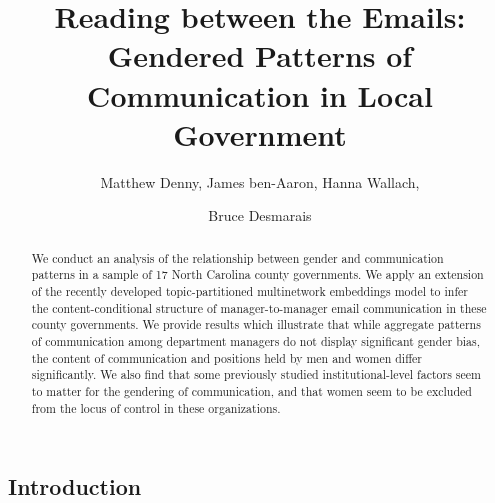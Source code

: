 \documentclass{pnastwo}
\begin{document}
\title{Reading between the Emails: Gendered Patterns of Communication in Local Government}

\author{
Matthew Denny,
James ben-Aaron,
Hanna Wallach,
\and Bruce Desmarais
}

\contributor{\vspace{-.25cm}}


\maketitle

\begin{article}
\begin{abstract}
{We conduct an analysis of the relationship between gender and communication patterns in a sample of 17 North Carolina county governments. We apply an extension of the recently developed topic-partitioned multinetwork embeddings model to infer the content-conditional structure of manager-to-manager email communication in these county governments. We provide results which illustrate that while aggregate patterns of communication among department managers do not display significant gender bias, the content of communication and positions held by men and women differ significantly. We also find that some previously studied institutional-level factors seem to matter for the gendering of communication, and that women seem to be excluded from the locus of control in these organizations.
}
\end{abstract} 



\section{Introduction}





\end{article}
\end{document}

